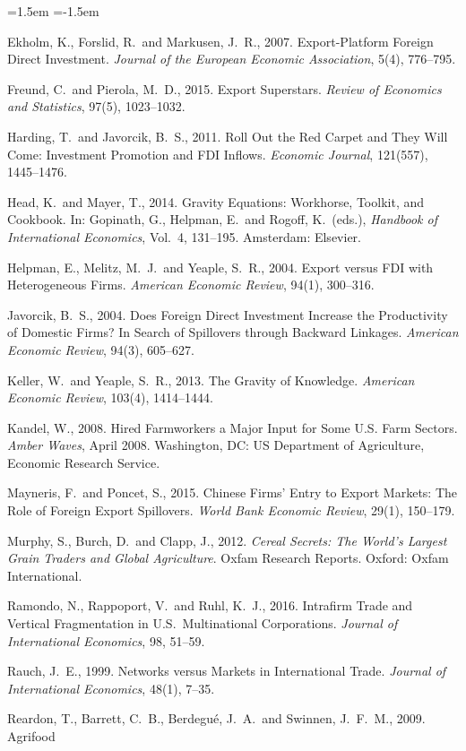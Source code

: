 \documentclass[11pt,a4paper]{article}
\begin{document}
\begin{list}{}{\leftmargin=1.5em \itemindent=-1.5em \itemsep=2pt \topsep=4pt}
\item Ekholm, K., Forslid, R.\ and Markusen, J.\ R., 2007. Export-Platform Foreign Direct
Investment. \emph{Journal of the European Economic Association}, 5(4), 776--795.
\item Freund, C.\ and Pierola, M.\ D., 2015. Export Superstars. \emph{Review of Economics and
Statistics}, 97(5), 1023--1032.
\item Harding, T.\ and Javorcik, B.\ S., 2011. Roll Out the Red Carpet and They Will Come:
Investment Promotion and FDI Inflows. \emph{Economic Journal}, 121(557), 1445--1476.
\item Head, K.\ and Mayer, T., 2014. Gravity Equations: Workhorse, Toolkit, and Cookbook. In:
Gopinath, G., Helpman, E.\ and Rogoff, K.\ (eds.), \emph{Handbook of International Economics},
Vol.\ 4, 131--195. Amsterdam: Elsevier.
\item Helpman, E., Melitz, M.\ J.\ and Yeaple, S.\ R., 2004. Export versus FDI with Heterogeneous
Firms. \emph{American Economic Review}, 94(1), 300--316.
\item Javorcik, B.\ S., 2004. Does Foreign Direct Investment Increase the Productivity of Domestic
Firms? In Search of Spillovers through Backward Linkages. \emph{American Economic Review}, 94(3),
605--627.
\item Keller, W.\ and Yeaple, S.\ R., 2013. The Gravity of Knowledge. \emph{American Economic
Review}, 103(4), 1414--1444.
\item Kandel, W., 2008. Hired Farmworkers a Major Input for Some U.S. Farm Sectors. \emph{Amber
Waves}, April 2008. Washington, DC: US Department of Agriculture, Economic Research Service.
\item Mayneris, F.\ and Poncet, S., 2015. Chinese Firms' Entry to Export Markets: The Role of
Foreign Export Spillovers. \emph{World Bank Economic Review}, 29(1), 150--179.
\item Murphy, S., Burch, D.\ and Clapp, J., 2012. \emph{Cereal Secrets: The World's Largest Grain
Traders and Global Agriculture}. Oxfam Research Reports. Oxford: Oxfam International.
\item Ramondo, N., Rappoport, V.\ and Ruhl, K.\ J., 2016. Intrafirm Trade and Vertical
Fragmentation in U.S.\ Multinational Corporations. \emph{Journal of International Economics}, 98,
51--59.
\item Rauch, J.\ E., 1999. Networks versus Markets in International Trade. \emph{Journal of
International Economics}, 48(1), 7--35.
\item Reardon, T., Barrett, C.\ B., Berdegu\'e, J.\ A.\ and Swinnen, J.\ F.\ M., 2009. Agrifood

\end{list}
\end{document}
